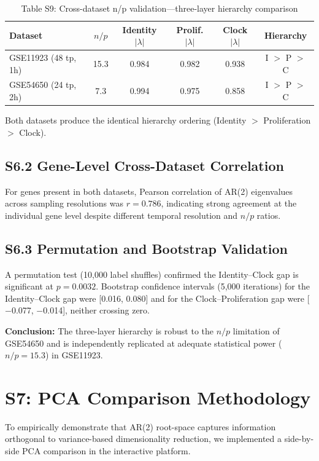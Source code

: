 \documentclass[11pt,a4paper]{article}
\begin{document}
\begin{table}[H]
\centering
\caption{Table S9: Cross-dataset n/p validation---three-layer hierarchy comparison}
\label{tab:np_validation_supp}
\begin{tabular}{lccccc}
\toprule
Dataset & $n/p$ & Identity $|\lambda|$ & Prolif. $|\lambda|$ & Clock $|\lambda|$ & Hierarchy \\
\midrule
GSE11923 (48 tp, 1h) & 15.3 & 0.984 & 0.982 & 0.938 & I $>$ P $>$ C \\
GSE54650 (24 tp, 2h) & 7.3 & 0.994 & 0.975 & 0.858 & I $>$ P $>$ C \\
\bottomrule
\end{tabular}
\end{table}

Both datasets produce the identical hierarchy ordering (Identity $>$ Proliferation $>$ Clock).

\subsection{S6.2 Gene-Level Cross-Dataset Correlation}

For genes present in both datasets, Pearson correlation of AR(2) eigenvalues across sampling resolutions was $r = 0.786$, indicating strong agreement at the individual gene level despite different temporal resolution and $n/p$ ratios.

\subsection{S6.3 Permutation and Bootstrap Validation}

A permutation test (10,000 label shuffles) confirmed the Identity--Clock gap is significant at $p = 0.0032$. Bootstrap confidence intervals (5,000 iterations) for the Identity--Clock gap were [0.016, 0.080] and for the Clock--Proliferation gap were [$-$0.077, $-$0.014], neither crossing zero.

\textbf{Conclusion:} The three-layer hierarchy is robust to the $n/p$ limitation of GSE54650 and is independently replicated at adequate statistical power ($n/p = 15.3$) in GSE11923.

\section{S7: PCA Comparison Methodology}

To empirically demonstrate that AR(2) root-space captures information orthogonal to variance-based dimensionality reduction, we implemented a side-by-side PCA comparison in the interactive platform.
\end{document}
